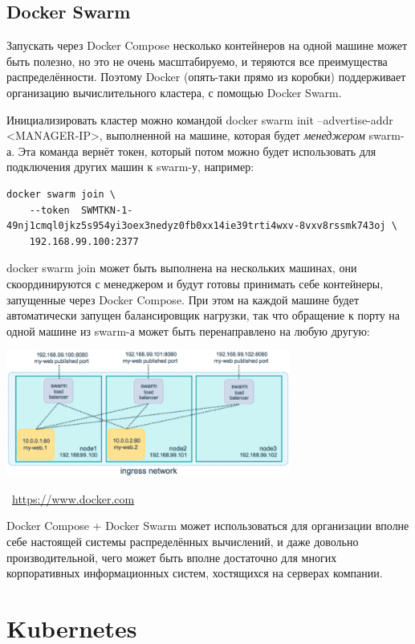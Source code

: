 \documentclass[a5paper]{article}
\newcommand{\attribution}[1] {
    \vspace{-5mm}\begin{flushright}\begin{scriptsize}\textcolor{gray}{\textcopyright\, #1}\end{scriptsize}\end{flushright}
}
\begin{document}
\subsection{Docker Swarm}

Запускать через Docker Compose несколько контейнеров на одной машине может быть полезно, но это не очень масштабируемо, и теряются все преимущества распределённости. Поэтому Docker (опять-таки прямо из коробки) поддерживает организацию вычислительного кластера, с помощью Docker Swarm.

Инициализировать кластер можно командой docker swarm init --advertise-addr <MANAGER-IP>, выполненной на машине, которая будет \emph{менеджером} swarm-а. Эта команда вернёт токен, который потом можно будет использовать для подключения других машин к swarm-у, например: 

\begin{verbatim}
docker swarm join \
    --token  SWMTKN-1-49nj1cmql0jkz5s954yi3oex3nedyz0fb0xx14ie39trti4wxv-8vxv8rssmk743oj \
    192.168.99.100:2377
\end{verbatim}

docker swarm join может быть выполнена на нескольких машинах, они скоординируются с менеджером и будут готовы принимать себе контейнеры, запущенные через Docker Compose. При этом на каждой машине будет автоматически запущен балансировщик нагрузки, так что обращение к порту на одной машине из swarm-а может быть перенаправлено на любую другую:

\begin{center}
    \includegraphics[width=0.7\textwidth]{swarmLoadBalancing.png}
    \attribution{\url{https://www.docker.com}}
\end{center}

Docker Compose + Docker Swarm может использоваться для организации вполне себе настоящей системы распределённых вычислений, и даже довольно производительной, чего может быть вполне достаточно для многих корпоративных информационных систем, хостящихся на серверах компании.

\section{Kubernetes}
\end{document}
